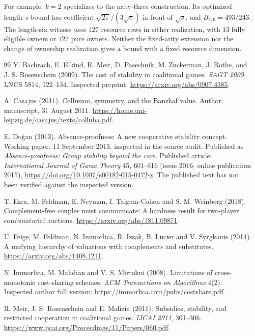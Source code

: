 \documentclass[11pt]{article}
\theoremstyle{definition}\newtheorem{definition}[theorem]{Definition}
\theoremstyle{remark}\newtheorem{remark}[theorem]{Remark}
\begin{document}
For example, $k=2$ specializes to the arity-three construction.  Its optimized
length-$s$ bound has coefficient
$\sqrt{2\pi}/(3\sqrt e)$ in front of $\sqrt s$, and $B_{2,6}=493/243$.
The length-six witness uses $127$ resource rows in either realization,
with $13$ fully eligible owners or $127$ pure owners.  Neither the
fixed-arity extension nor the change of ownership realization gives a
bound with a fixed resource dimension.

\begin{thebibliography}{99}
Y. Bachrach, E. Elkind, R. Meir, D. Pasechnik, M. Zuckerman, J. Rothe,
and J. S. Rosenschein (2009).
The cost of stability in coalitional games.
\emph{SAGT 2009}, LNCS 5814, 122--134.
Inspected preprint: \url{https://arxiv.org/abs/0907.4385}.

A. Casajus (2011).
Collusion, symmetry, and the Banzhaf value.
Author manuscript, 31 August 2011.
\url{https://home.uni-leipzig.de/casajus/texts/colluba.pdf}.

E. Do\u{g}an (2013).
Absence-proofness: A new cooperative stability concept.
Working paper, 11 September 2013, inspected in the source audit.
Published as \emph{Absence-proofness: Group stability beyond the core}.
Published article: \emph{International Journal of Game Theory} 45, 601--616
(issue 2016; online publication 2015),
\url{https://doi.org/10.1007/s00182-015-0472-z}.
The published text has not been verified against the inspected version.

T. Ezra, M. Feldman, E. Neyman, I. Talgam-Cohen and S. M. Weinberg (2018).
Complement-free couples must communicate: A hardness result for two-player
combinatorial auctions. \url{https://arxiv.org/abs/1811.09871}.

U. Feige, M. Feldman, N. Immorlica, R. Izsak, B. Lucier and V. Syrgkanis (2014).
A unifying hierarchy of valuations with complements and substitutes.
\url{https://arxiv.org/abs/1408.1211}.

N. Immorlica, M. Mahdian and V. S. Mirrokni (2008).
Limitations of cross-monotonic cost-sharing schemes.
\emph{ACM Transactions on Algorithms} 4(2).
Inspected author full version: \url{https://immorlica.com/pubs/costshare.pdf}.

R. Meir, J. S. Rosenschein and E. Malizia (2011).
Subsidies, stability, and restricted cooperation in coalitional games.
\emph{IJCAI 2011}, 301--306.
\url{https://www.ijcai.org/Proceedings/11/Papers/060.pdf}.


\end{thebibliography}
\end{document}
